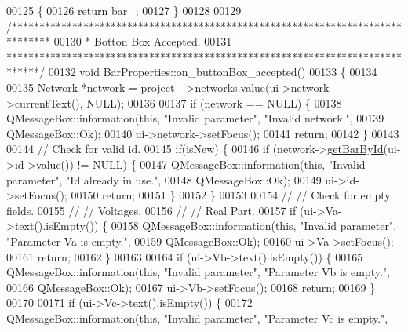 \begin{DoxyCode}
00125 \{
00126   \textcolor{keywordflow}{return} bar\_;
00127 \}
00128 
00129 \textcolor{comment}{/*******************************************************************************}
00130 \textcolor{comment}{ * Botton Box Accepted.}
00131 \textcolor{comment}{ ******************************************************************************/}
00132 \textcolor{keywordtype}{void} BarProperties::on\_buttonBox\_accepted()
00133 \{
00134 
00135   \hyperlink{class_network}{Network} *network = project\_->\hyperlink{class_project_aa98126154cab59769a431668e6f17daf}{networks}.value(ui->network->currentText(), NULL);
00136 
00137   \textcolor{keywordflow}{if} (network == NULL) \{
00138     QMessageBox::information(\textcolor{keyword}{this}, \textcolor{stringliteral}{"Invalid parameter"}, \textcolor{stringliteral}{"Invalid network."},
00139                              QMessageBox::Ok);
00140     ui->network->setFocus();
00141     \textcolor{keywordflow}{return};
00142   \}
00143 
00144   \textcolor{comment}{// Check for valid id.}
00145   \textcolor{keywordflow}{if}(isNew) \{
00146     \textcolor{keywordflow}{if} (network->\hyperlink{group___graphics_ga04d524ce0fa0dd0d06deda92b1597af0}{getBarById}(ui->id->value()) != NULL) \{
00147       QMessageBox::information(\textcolor{keyword}{this}, \textcolor{stringliteral}{"Invalid parameter"}, \textcolor{stringliteral}{"Id already in use."},
00148                                QMessageBox::Ok);
00149       ui->id->setFocus();
00150       \textcolor{keywordflow}{return};
00151     \}
00152   \}
00153 
00154 \textcolor{comment}{//  // Check for empty fields.}
00155 \textcolor{comment}{//  // Voltages.}
00156 \textcolor{comment}{//  // Real Part.}
00157   \textcolor{keywordflow}{if} (ui->Va->text().isEmpty()) \{
00158     QMessageBox::information(\textcolor{keyword}{this}, \textcolor{stringliteral}{"Invalid parameter"}, \textcolor{stringliteral}{"Parameter Va is empty."},
00159                              QMessageBox::Ok);
00160     ui->Va->setFocus();
00161     \textcolor{keywordflow}{return};
00162   \}
00163 
00164   \textcolor{keywordflow}{if} (ui->Vb->text().isEmpty()) \{
00165     QMessageBox::information(\textcolor{keyword}{this}, \textcolor{stringliteral}{"Invalid parameter"}, \textcolor{stringliteral}{"Parameter Vb is empty."},
00166                              QMessageBox::Ok);
00167     ui->Vb->setFocus();
00168     \textcolor{keywordflow}{return};
00169   \}
00170 
00171   \textcolor{keywordflow}{if} (ui->Vc->text().isEmpty()) \{
00172     QMessageBox::information(\textcolor{keyword}{this}, \textcolor{stringliteral}{"Invalid parameter"}, \textcolor{stringliteral}{"Parameter Vc is empty."},

\end{DoxyCode}
